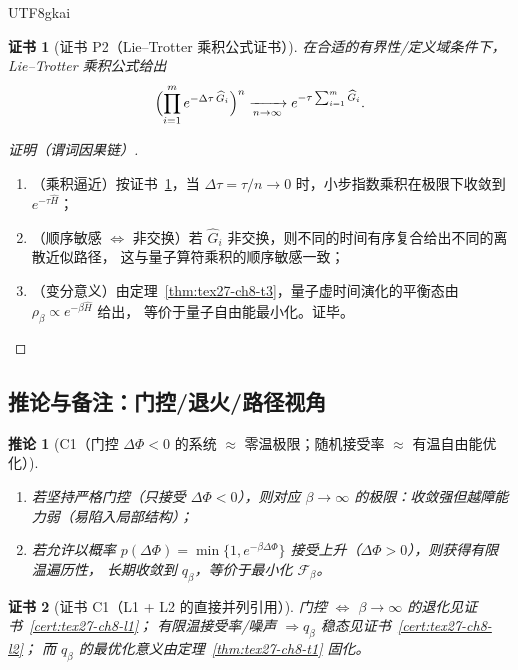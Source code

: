 \documentclass[12pt]{article}
\newtheorem{corollary}{推论}[section]
\newtheorem{Certificate}{证书}[section]
\begin{document}
\begin{CJK*}{UTF8}{gkai}
\begin{Certificate}[证书 P2（Lie--Trotter 乘积公式证书）]
\label{cert:tex27-ch8-p2}
在合适的有界性/定义域条件下，Lie--Trotter 乘积公式给出
\[
  \Bigl(\prod_{i=1}^m e^{-\Delta\tau\,\widehat{G}_i}\Bigr)^{n}
  \xrightarrow[n\to\infty]{}
  e^{-\tau\sum_{i=1}^m \widehat{G}_i}.
\]
\end{Certificate}

\begin{proof}[证明（谓词因果链）]
\begin{enumerate}
  \item（乘积逼近）按证书~\ref{cert:tex27-ch8-p2}，当 $\Delta\tau=\tau/n\to 0$ 时，小步指数乘积在极限下收敛到 $e^{-\tau\widehat{H}}$；
  \item（顺序敏感 $\Leftrightarrow$ 非交换）若 $\widehat{G}_i$ 非交换，则不同的时间有序复合给出不同的离散近似路径，
  这与量子算符乘积的顺序敏感一致；
  \item（变分意义）由定理~\ref{thm:tex27-ch8-t3}，量子虚时间演化的平衡态由 $\rho_\beta\propto e^{-\beta\widehat{H}}$ 给出，
  等价于量子自由能最小化。证毕。
\end{enumerate}
\end{proof}

\subsection{推论与备注：门控/退火/路径视角}
\label{subsec:tex27-ch8-others}

\begin{corollary}[C1（门控 $\Delta\Phi<0$ 的系统 $\approx$ 零温极限；随机接受率 $\approx$ 有温自由能优化）]
\label{cor:tex27-ch8-c1}
\begin{enumerate}
  \item 若坚持严格门控（只接受 $\Delta\Phi<0$），则对应 $\beta\to\infty$ 的极限：收敛强但越障能力弱（易陷入局部结构）；
  \item 若允许以概率 $p(\Delta\Phi)=\min\{1,e^{-\beta\Delta\Phi}\}$ 接受上升（$\Delta\Phi>0$），则获得有限温遍历性，
  长期收敛到 $q_\beta$，等价于最小化 $\mathcal{F}_\beta$。
\end{enumerate}
\end{corollary}

\begin{Certificate}[证书 C1（L1 + L2 的直接并列引用）]
\label{cert:tex27-ch8-c1}
门控 $\Leftrightarrow$ $\beta\to\infty$ 的退化见证书~\ref{cert:tex27-ch8-l1}；
有限温接受率/噪声 $\Rightarrow q_\beta$ 稳态见证书~\ref{cert:tex27-ch8-l2}；
而 $q_\beta$ 的最优化意义由定理~\ref{thm:tex27-ch8-t1} 固化。
\end{Certificate}


\end{CJK*}
\end{document}
